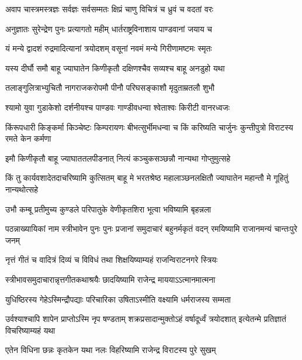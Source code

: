\twolineshloka
{अवाप चास्त्रमस्त्रज्ञः सर्वज्ञः सर्वसम्मतः}
{क्षिप्रं चाणु विचित्रं च ध्रुवं च वदतां वरः}


\twolineshloka
{अनुज्ञातः सुरेन्द्रेण पुनः प्रत्यागतो महीम्}
{धार्तराष्ट्रविनाशाय पाण्डवानां जयाय च}


\twolineshloka
{यं मन्ये द्वादशं रुद्रमादित्यानां त्रयोदशम्}
{वसूनां नवमं मन्ये गिरीणामष्टमः स्मृतः}


\twolineshloka
{यस्य दीर्घौ समौ बाहू ज्याघातेन किणीकृतौ}
{दक्षिणश्चैव सव्यश्च बाहू अनडुहो यथा}



\twolineshloka
{तलाङ्गुलित्राभ्युचितौ नागराजकरोपमौ}
{पीनौ परिघसङ्काशौ मृदुताम्रतलौ शुभौ}


\twolineshloka
{श्यामो युवा गुडाकेशो दर्शनीयश्च पाण्डवः}
{गाण्डीवधन्वा श्वेताश्वः किरीटी वानरध्वजः}


\threelineshloka
{किंरूपधारी किङ्कर्मा किञ्चेष्टः किम्परायणः}
{बीभत्सुर्भीमधन्वा च किं करिष्यति चार्जुनः}
{कुन्तीपुत्रो विराटस्य रमते केन कर्मणा}




\twolineshloka
{इमौ किणीकृतौ बाहू ज्याघाततलपीडनात्}
{नित्यं कञ्चुकसञ्छन्नौ नान्यथा गोप्तुमुत्सहे}


\onelineshloka
{किं तु कार्यवशादेतदाचरिष्यामि कुत्सितम्}
\twolineshloka
{बाहू मे भरतश्रेष्ठ महालाञ्छनलक्षितौ}
{ज्याघातेन महान्तौ मे गूहितुं नान्यथोत्सहे}


\twolineshloka
{उभौ कम्बू प्रतीमुच्य कुण्डले परिपातुके}
{वेणीकृतशिरा भूत्वा भविष्यामि बृहन्नला}


\threelineshloka
{पठन्नाख्यायिकां नाम स्त्रीभावेन पुनः पुनः}
{प्रजानां समुदाचारं बहुनर्मकृतं वदन्}
{रमयिष्यामि राजानमन्यं चान्तःपुरे जनम्}


\twolineshloka
{नृत्तं गीतं च वादित्रं दिव्यं च विविधं तथा}
{शिक्षयिष्याम्यहं राजन्विराटनगरे स्त्रियः}


\twolineshloka
{स्त्रीभावसमुदाचारान्नृत्तगीतकथाश्रयैः}
{छादयिष्यामि राजेन्द्र माययाऽऽत्मानमात्मना}


\twolineshloka
{युधिष्ठिरस्य गेहेऽस्मिन्द्रौपद्याः परिचारिका}
{उषिताऽस्मीति वक्ष्यामि धर्मराजस्य सम्मता}


\threelineshloka
{उर्वश्याश्चापि शापेन प्राप्तोऽस्मि नृप षण्डताम्}
{शक्रप्रसादान्मुक्तोऽहं वर्षादूर्ध्वं त्रयोदशात्}
{इत्येतन्मे प्रतिज्ञातं विचरिष्याम्यहं यथा}


\twolineshloka
{एतेन विधिना छन्नः कृतकेन यथा नलः}
{विहरिष्यामि राजेन्द्र विराटस्य पुरे सुखम्}

